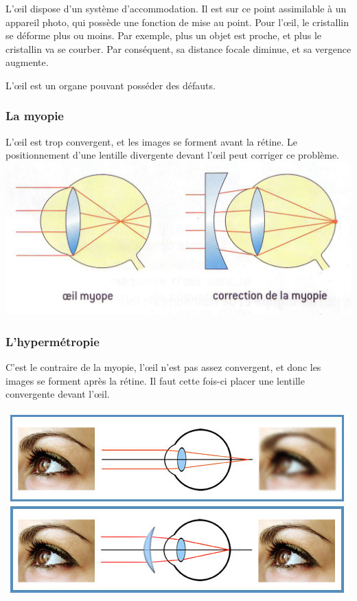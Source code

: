 \documentclass[a4paper, 12pt, onecolumn, openany]{report}
\begin{document}
	L’œil dispose d’un système d’accommodation. Il est sur ce point assimilable à un appareil photo, qui possède une fonction de mise au point. Pour l’œil, le cristallin se déforme plus ou moins. Par exemple, plus un objet est proche, et plus le cristallin va se courber. Par conséquent, sa distance focale diminue, et sa vergence augmente. 

	L’œil est un organe pouvant posséder des défauts.

	\subsubsection{La myopie}
	L’œil est trop convergent, et les images se forment avant la rétine. Le positionnement d’une lentille divergente devant l’œil peut corriger ce problème.
	\includegraphics{myopie.jpg}
	
	\subsubsection{L'hypermétropie}
	C’est le contraire de la myopie, l’œil n’est pas assez convergent, et donc les images se forment après la rétine. Il faut cette fois-ci placer une lentille convergente devant l’œil.
	
	\includegraphics[scale=0.5]{hypermetropie.jpg}
	
\end{document}
